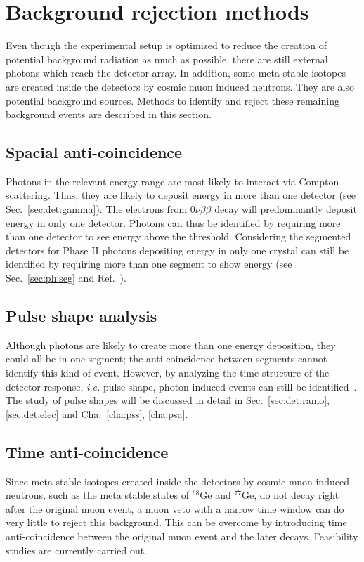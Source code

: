 \section{Background rejection methods}
\label{sec:gerda:anti}
Even though the experimental setup is optimized to reduce the creation of potential background radiation as much as possible, there are still external photons which reach the detector array. In addition, some meta stable isotopes are created inside the detectors by cosmic muon induced neutrons. They are also potential background sources. Methods to identify and reject these remaining background events are described in this section.

\subsection{Spacial anti-coincidence} 
\label{sec:gerda:santi}
Photons in the relevant energy range are most likely to interact via Compton scattering. Thus, they are likely to deposit energy in more than one detector (see Sec.~\ref{sec:det:gamma}). The electrons from $0\nu\beta\beta$ decay will predominantly deposit energy in only one detector. Photons can thus be identified by requiring more than one detector to see energy above the threshold. Considering the segmented detectors for Phase II photons depositing energy in only one crystal can still be identified by requiring more than one segment to show energy (see Sec.~\ref{sec:ph:seg} and Ref.~\cite{Sipid}).

\subsection{Pulse shape analysis}
\label{sec:gerda:psa}
Although photons are likely to create more than one energy deposition, they could all be in one segment; the anti-coincidence between segments cannot identify this kind of event. However, by analyzing the time structure of the detector response, \textit{i.e.} pulse shape, photon induced events can still be identified~\cite{Kev07}. The study of pulse shapes will be discussed in detail in Sec.~\ref{sec:det:ramo}, \ref{sec:det:elec} and Cha.~\ref{cha:pss}, \ref{cha:psa}.

\subsection{Time anti-coincidence} 
\label{sec:gerda:tanti}
Since meta stable isotopes created inside the detectors by cosmic muon induced neutrons, such as the meta stable states of $^{68}$Ge and $^{77}$Ge, do not decay right after the original muon event, a muon veto with a narrow time window can do very little to reject this background. This can be overcome by introducing time anti-coincidence between the original muon event and the later decays. Feasibility studies are currently carried out.

